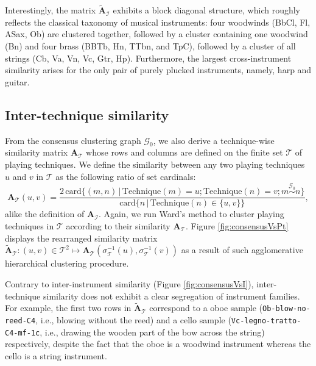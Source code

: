 \documentclass{bmcart}
\makeatletter
\newcommand*{\ie}{i.e.,\@\xspace}
\newcommand{\Card}{\mathrm{card}}
\makeatother
\begin{document}
Interestingly, the matrix $\widetilde{\mathbf{A}}_{\mathcal{I}}$ exhibits a block diagonal structure, which roughly reflects the classical taxonomy of musical instruments: four woodwinds (BbCl, Fl, ASax, Ob) are clustered together, followed by a cluster containing one woodwind (Bn) and four brass (BBTb, Hn, TTbn, and TpC), followed by a cluster of all strings (Cb, Va, Vn, Vc, Gtr, Hp).
Furthermore, the largest cross-instrument similarity arises for the only pair of purely plucked instruments, namely, harp and guitar.


\subsection*{Inter-technique similarity}
From the consensus clustering graph $\mathcal{G}_0$, we also derive a technique-wise similarity matrix $\mathbf{A}_{\mathcal{T}}$ whose rows and columns are defined on the finite set $\mathcal{T}$ of playing techniques.
We define the similarity between any two playing techniques $u$ and $v$ in $\mathcal{T}$ as the following ratio of set cardinals:
\begin{equation}
\mathbf{A}_{\mathcal{T}}(u,v) = \dfrac{
2\,\Card \big\{ (m, n) \,\vert\, \mathrm{Technique}(m)=u ; \mathrm{Technique}(n)=v ; m \overset{\mathcal{G}_0}{\sim} n \big\}
}{
\Card \big\{n \,\vert\, \mathrm{Technique}(n) \in \{ u, v \} \big\}
},
\label{eq:technique-similarity}
\end{equation}
alike the definition of $\mathbf{A}_{\mathcal{I}}$.
Again, we run Ward's method to cluster playing techniques in $\mathcal{T}$ according to their similarity $\mathbf{A}_{\mathcal{T}}$.
Figure \ref{fig:consensusVsPt} displays the rearranged similarity matrix $\widetilde{\mathbf{A}}_{\mathcal{T}} : (u,v)\in \mathcal{T}^2 \mapsto \mathbf{A}_{\mathcal{T}}(\sigma_{\mathcal{T}}^{-1}(u), \sigma_{\mathcal{T}}^{-1}(v))$ as a result of such agglomerative hierarchical clustering procedure.

Contrary to inter-instrument similarity (Figure \ref{fig:consensusVsI}), inter-technique similarity does not exhibit a clear segregation of instrument families.
For example, the first two rows in $\widetilde{\mathbf{A}}_{\mathcal{T}}$ correspond to a oboe sample (\texttt{Ob-blow-no-reed-C4}, \ie{} blowing without the reed) and a cello sample (\texttt{Vc-legno-tratto-C4-mf-1c}, \ie{} drawing the wooden part of the bow across the string) respectively, despite the fact that the oboe is a woodwind instrument whereas the cello is a string instrument.
\end{document}
